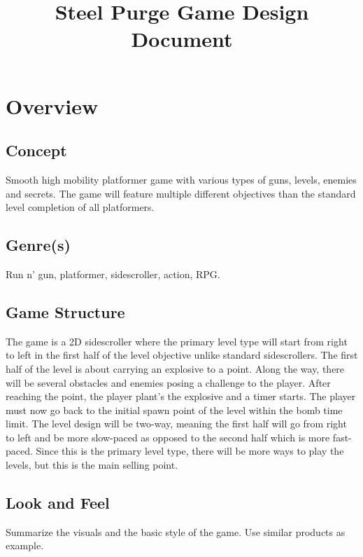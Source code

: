\documentclass[12pt]{article}
\title{Steel Purge Game Design Document}
\begin{document}
\maketitle{}

\section{Overview}


\subsection{Concept}

Smooth high mobility platformer game with various types of guns, levels, enemies and secrets. The game will feature multiple different objectives than the standard level completion of all platformers. 

\subsection{Genre(s)}

Run n' gun, platformer, sidescroller, action, RPG.

\subsection{Game Structure}

The game is a 2D sidescroller where the primary level type will start from right to left in the first half of the level objective unlike standard sidescrollers. The first half of the level is about carrying an explosive to a point. Along the way, there will be several obstacles and enemies posing a challenge to the player. After reaching the point, the player plant's the explosive and a timer starts. The player must now go back to the initial spawn point of the level within the bomb time limit. The level design will be two-way, meaning the first half will go from right to left and be more slow-paced as opposed to the second half which is more fast-paced. Since this is the primary level type, there will be more ways to play the levels, but this is the main selling point. 

\subsection{Look and Feel}

Summarize the visuals and the basic style of the game. Use similar products as example. 
\end{document}
